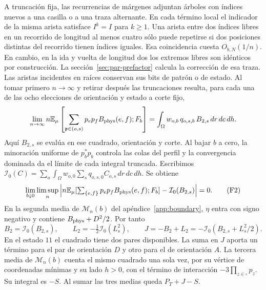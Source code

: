 A truncación fija, las recurrencias de márgenes adjuntan árboles con índices nuevos a una
casilla o a una traza alternante. En cada término local el indicador de la misma arista satisface
\(I^k=I\) para \(k\ge1\). Una arista entre dos índices libres en un recorrido de longitud al
menos cuatro sólo puede repetirse si dos posiciones distintas del recorrido tienen índices
iguales. Esa coincidencia cuesta \(O_{b,N}(1/n)\). En cambio, en la ida y vuelta de longitud dos
los extremos libres son idénticos por construcción. La sección~\ref{sec:par-prefactor} calcula
la corrección de esa traza. Las aristas incidentes en raíces conservan sus bits de patrón o de estado.
Al tomar primero \(n\to\infty\) y retirar después las truncaciones resulta, para cada una de las
ocho elecciones de orientación y estado a corte fijo,
\[
 \lim_{n\to\infty}n\mathbb E_\mu
 \left[\sum_{\mathfrak p\in(o,s)}p_ep_f B_{\rm phys}(e,f);F_b\right]
 =\int_\Omega w_{o,b}\,q_{o,s,b}\,B_{2,s}\,dr\,dc\,dh .
\]
Aquí \(B_{2,s}\) se evalúa en ese cuadrado, orientación y corte. Al bajar \(b\) a cero,
la minoración uniforme de \(p_b^*p_b\) controla las colas del perfil y la convergencia
dominada da el límite de cada integral truncada. Escribimos
\(\mathcal I_0(C)=\sum_o\int_\Omega w_{o,0}\sum_s q_{o,s,0}C_{o,s}\,dr\,dc\,dh\). Se obtiene
\[
 \lim_{b\downarrow0}\limsup_n\left|
 n\mathbb E_\mu[\textstyle\sum_{\{e,f\}}p_ep_f B_{\rm phys}(e,f);F_b]
 -\mathcal I_0(B_{2,s})\right|=0. \tag{F2}
\]
En la segunda media de \(\mathcal M_n(b)\) del apéndice~\ref{app:boundary}, \(\eta\) entra con signo
negativo y contiene \(B_{\rm phys}+D^2/2\). Por tanto
\begin{equation}\label{eq:J-def}
 B_2=\mathcal I_0(B_{2,s}),\qquad L_2=-\tfrac12\mathcal I_0(L_s^2),\qquad
 J=-B_2+L_2=-\mathcal I_0(B_{2,s}+L_s^2/2).
\end{equation}
En el estado \(11\) el cuadrado tiene dos pares disponibles. La suma en \(J\) aporta un término
para el par de orientación \(D\) y otro para el de orientación \(A\). La tercera media de
\(\mathcal M_n(b)\) cuenta el mismo cuadrado una sola vez, por su vértice de coordenadas mínimas y su lado
 \(h>0\),
con el término de interacción \(-3\prod_{z\in\square}p_z\). Su integral es \(-S\).
Al sumar las tres medias queda \(P_T+J-S\).
